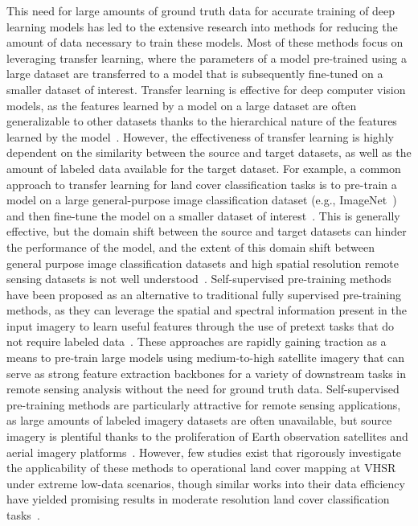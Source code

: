 This need for large amounts of ground truth data for accurate training of deep learning models has led to the extensive research into methods for reducing the amount of data necessary to train these models.
Most of these methods focus on leveraging transfer learning, where the parameters of a model pre-trained using a large dataset are transferred to a model that is subsequently fine-tuned on a smaller dataset of interest.
Transfer learning is effective for deep computer vision models, as the features learned by a model on a large dataset are often generalizable to other datasets thanks to the hierarchical nature of the features learned by the model~\citep{huTransferringDeepConvolutional2015, kolesnikovBigTransferBiT2020}.
However, the effectiveness of transfer learning is highly dependent on the similarity between the source and target datasets, as well as the amount of labeled data available for the target dataset.
For example, a common approach to transfer learning for land cover classification tasks is to pre-train a model on a large general-purpose image classification dataset (e.g., ImageNet~\citep{russakovskyImageNetLargeScale2015}) and then fine-tune the model on a smaller dataset of interest~\citep{piresdelimaConvolutionalNeuralNetwork2020}.
This is generally effective, but the domain shift between the source and target datasets can hinder the performance of the model, and the extent of this domain shift between general purpose image classification datasets and high spatial resolution remote sensing datasets is not well understood~\citep{maTransferLearningEnvironmental2024}.
Self-supervised pre-training methods have been proposed as an alternative to traditional fully supervised pre-training methods, as they can leverage the spatial and spectral information present in the input imagery to learn useful features through the use of pretext tasks that do not require labeled data~\citep{wuUnsupervisedFeatureLearning2018,tianContrastiveMultiviewCoding2020, chenSimpleFrameworkContrastive2020}.
These approaches are rapidly gaining traction as a means to pre-train large models using medium-to-high satellite imagery that can serve as strong feature extraction backbones for a variety of downstream tasks in remote sensing analysis without the need for ground truth data.
Self-supervised pre-training methods are particularly attractive for remote sensing applications, as large amounts of labeled imagery datasets are often unavailable, but source imagery is plentiful thanks to the proliferation of Earth observation satellites and aerial imagery platforms~\citep{xiaoFoundationModelsRemote2025}.
However, few studies exist that rigorously investigate the applicability of these methods to operational land cover mapping at VHSR under extreme low-data scenarios, though similar works into their data efficiency have yielded promising results in moderate resolution land cover classification tasks~\citep{ayushGeographyAwareSelfSupervisedLearning2021, manasSeasonalContrastUnsupervised2021a}.

